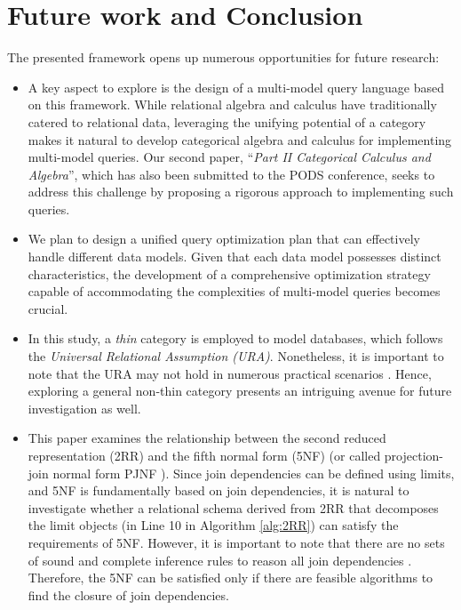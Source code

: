 \section{Future work and Conclusion}
\label{sec:futurework}


The presented framework opens up numerous opportunities for future research:


\begin{itemize}[noitemsep,topsep=0pt]
  \item A key aspect to explore is the design of a multi-model query language based on this framework. While relational algebra and calculus have traditionally catered to relational data, leveraging the unifying potential of a category makes it natural to develop categorical algebra and calculus for implementing multi-model queries. Our second paper, ``\textit{Part II Categorical Calculus and Algebra}'', which has also been submitted to the PODS conference, seeks to address this challenge by proposing a rigorous approach to implementing such queries.

  
  \item We plan to design a unified query optimization plan that can effectively handle different data models. Given that each data model possesses distinct characteristics, the development of a comprehensive optimization strategy capable of accommodating the complexities of multi-model queries becomes crucial.
  \item In this study, a \textit{thin} category is employed to model databases, which follows the \textit{Universal Relational Assumption (URA)}. Nonetheless, it is important to note that the URA may not hold in numerous practical scenarios \cite{10.1145/588111.588113}. Hence, exploring a general non-thin category presents an intriguing avenue for future investigation as well.
\item This paper examines the relationship between the second reduced representation (2RR) and the fifth normal form (5NF) (or called projection-join normal form PJNF \cite{10.1145/582095.582120}). Since join dependencies can be defined using limits, and 5NF is fundamentally based on join dependencies, it is natural to investigate whether a relational schema derived from 2RR that decomposes the limit objects (in Line 10 in Algorithm \ref{alg:2RR}) can satisfy the requirements of 5NF. However, it is important to note that there are no sets of sound and complete inference rules to reason all join dependencies  \cite{10.1145/322307.322313}. Therefore, the 5NF can be satisfied only if there are feasible algorithms to find the closure of join dependencies. 


  
\end{itemize}

